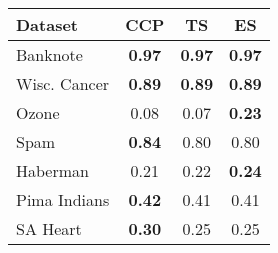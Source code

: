 \begin{tabular}{lccc}
\toprule
Dataset & CCP & TS & ES \\
\midrule
Banknote & \textbf{0.97} & \textbf{0.97} & \textbf{0.97} \\
Wisc. Cancer & \textbf{0.89} & \textbf{0.89} & \textbf{0.89} \\
Ozone & 0.08 & 0.07 & \textbf{0.23} \\
Spam & \textbf{0.84} & 0.80 & 0.80 \\
Haberman & 0.21 & 0.22 & \textbf{0.24} \\
Pima Indians & \textbf{0.42} & 0.41 & 0.41 \\
SA Heart & \textbf{0.30} & 0.25 & 0.25 \\
\bottomrule
\end{tabular}
